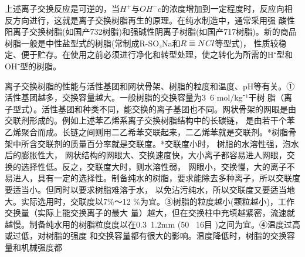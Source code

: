 上述离子交换反应是可逆的，当$H^+$与$OH^-c$的浓度增加到一定程度时，反应向相反方向进行，这就是离子交换树脂再生的原理。在纯水制造中，通常采用强
酸性阳离子交换树脂(如国产732树脂)和强碱性阴离子树脂(如国产717树脂)。新的商品树脂一般是中性盐型式的树脂(常制成R-SO₃Na和$R \superequiv NCl$等型式)，
性质较稳定、便于贮存。在使用之前必须进行净化和转型处理，使之转化为所需的H⁺型和OH⁻型的树脂。

离子交换树脂的性能与活性基团和网状骨架、树脂的粒度和温度、pH等有关。①活性基团越多，交换容量越大。一般树脂的交换容量为3~6 mol/kg⁻¹干树
脂（离子型式）。活性基团和种类不同，能交换的离子基团也不同。网状骨架的网眼是由交联剂形成的。例如上述苯乙烯系离子交换树脂结构中的长碳链，
是由若干个苯乙烯聚合而成。长链之间则用二乙希苯交联起来，二乙烯苯就是交联剂。*树脂骨架中所含交联剂的质量百分率就是交联度。*交联度小时，
树脂的水溶性强，泡水后的膨胀性大， 网状结构的网眼大、交换速度快，大小离子都容易进人网眼，交换的选择性低。反之，交联度大时，则水溶性弱，
网眼小，交换慢，大的离子不易进人，具有一定的选择性。制备纯水的树脂，要求能除去多种离子，所以交联度要适当小。但同时以要求树脂难溶于水，
以免沾污纯水，所以交联度又要适当地大。实际选用时，交联度以7\%～12 \%为宜。③树脂的粒度越小(颗粒越小)，工作交换量（实际上能交换离子的最大
量）越大，但在交换柱中充填越紧密，流速就越慢。制备纯水用的树脂粒度度以在0.3~1.2mm (50~ 16目 )之间为宜。④温度过高或过低，对树脂的强度
和交换容量都有很大的影响。温度降低时，树脂的交换容量和机械强度都